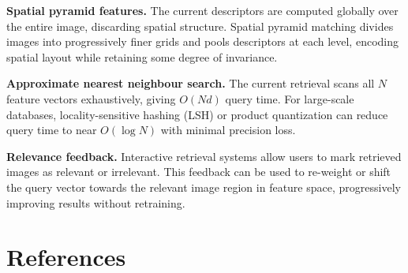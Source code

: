 \documentclass[12pt, a4paper]{article}
\begin{document}

\textbf{Spatial pyramid features.} The current descriptors are computed globally over the
entire image, discarding spatial structure. Spatial pyramid matching \cite{lazebnik2006}
divides images into progressively finer grids and pools descriptors at each level, encoding
spatial layout while retaining some degree of invariance.

\textbf{Approximate nearest neighbour search.} The current retrieval scans all $N$ feature
vectors exhaustively, giving $O(Nd)$ query time. For large-scale databases, locality-sensitive
hashing (LSH) or product quantization can reduce query time to near $O(\log N)$ with minimal
precision loss.

\textbf{Relevance feedback.} Interactive retrieval systems allow users to mark retrieved
images as relevant or irrelevant. This feedback can be used to re-weight or shift the query
vector towards the relevant image region in feature space, progressively improving results
without retraining.




\section*{References}
\end{document}
